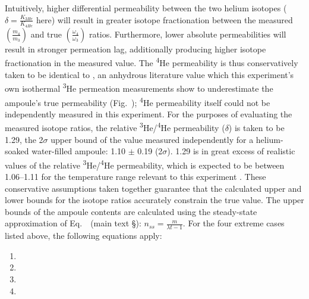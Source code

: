 Intuitively, higher differential permeability between the two helium isotopes ($\delta = \frac{K_{3He}}{K_{4He}}$ here) will result in greater isotope fractionation between the measured $\left(\frac{m_{4}}{m_{3}}\right)$ and true $\left(\frac{\omega_{4}}{\omega_{3}}\right)$ ratios.
Furthermore, lower absolute permeabilities will result in stronger permeation lag, additionally producing higher isotope fractionation in the measured value. The \textsuperscript{4}He permeability is thus conservatively taken to be identical to \citet{swets1961}, an anhydrous
literature value which this experiment's own isothermal \textsuperscript{3}He permeation measurements show to underestimate the ampoule's true permeability (Fig.~\MainFigAmpoulePermeability); \textsuperscript{4}He permeability itself could not be independently measured in this experiment. For the purposes of evaluating the measured isotope ratios, the relative \textsuperscript{3}He/\textsuperscript{4}He permeability ($\delta$) is taken to be 1.29, the 2$\sigma$ upper bound of the value measured independently for a helium-soaked water-filled ampoule:
1.10 $\pm$ 0.19 (2$\sigma$). 1.29 is in great excess of realistic values of the relative \textsuperscript{3}He/\textsuperscript{4}He permeability, which is expected to be between 1.06--1.11 for the temperature range relevant to this experiment \citep{jones1953}. These
conservative assumptions taken together guarantee that the calculated upper and lower bounds for the isotope ratios accurately constrain the true value. The upper bounds of the
ampoule contents are calculated using the steady-state approximation of Eq.~\MainEqSteadystate\ (main text \S\MainRefBounding): $n_{ss} = \frac{m}{\lambda t - 1}$. For the four extreme cases listed above, the following equations apply:

\begin{enumerate}
\item {}
\item {}
\item {}
\item {}
\end{enumerate}

